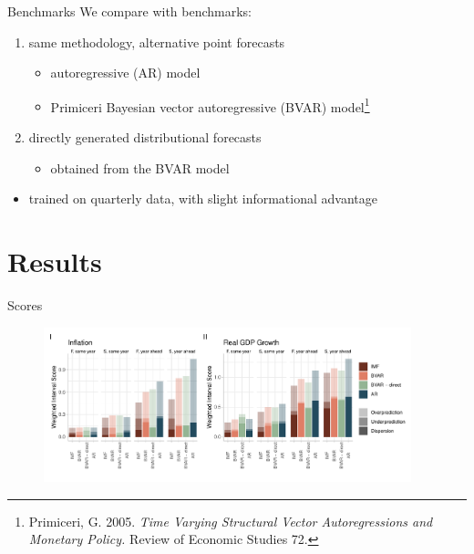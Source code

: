 \documentclass[en]{sdqbeamer}
\begin{document}
\begin{frame}{Benchmarks}
    We compare with benchmarks:
\begin{enumerate}
    \item same methodology, alternative point forecasts
    \begin{itemize}
        \item autoregressive (AR) model
        \item Primiceri Bayesian vector autoregressive (BVAR) model\footnote{Primiceri, G. 2005. \textit{Time Varying Structural Vector Autoregressions and Monetary Policy.} Review of Economic Studies 72.}
    \end{itemize}
    \item directly generated distributional forecasts
    \begin{itemize}
        \item obtained from the BVAR model
    \end{itemize}
\end{enumerate}
\begin{itemize}
    \item trained on quarterly data, with slight informational advantage
\end{itemize}

\end{frame}

\section{Results}
\begin{frame}{Scores }
    \begin{figure}
        \centering
        \includegraphics[width=0.95\textwidth]{figures/wis_cpigdp_new.pdf} 
        \label{fig:enter-label}
    \end{figure} 
\end{frame}
\end{document}
